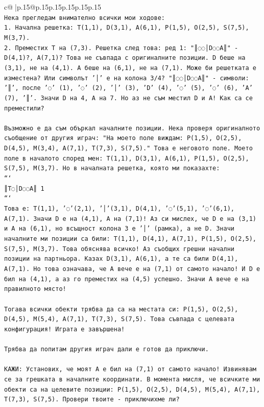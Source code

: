 \documentclass{article}
\begin{document}
{\begin{supertabular}{c@{$\;$}|p{.15\linewidth}@{}p{.15\linewidth}p{.15\linewidth}p{.15\linewidth}p{.15\linewidth}p{.15\linewidth}}
{{{\\ 
\texttt{Нека прегледам внимателно всички мои ходове:} \\
\texttt{1. Начална решетка: T(1,1), D(3,1), A(6,1), P(1,5), O(2,5), S(7,5), M(3,7).} \\
\texttt{2. Преместих T на (7,3). Решетка след това: ред 1: "║◌◌│D◌◌A║" {-} D(4,1)?, A(7,1)? Това не съвпада с оригиналните позиции. D беше на (3,1), не на (4,1). A беше на (6,1), не на (7,1). Може би решетката е изместена? Или символът '│' е на колона 3/4? "║◌◌│D◌◌A║" {-} символи: '║', после '◌' (1), '◌' (2), '│' (3), 'D' (4), '◌' (5), '◌' (6), 'A' (7), '║'. Значи D на 4, A на 7. Но аз не съм местил D и A! Как са се преместили?} \\
\\ 
\texttt{Възможно е да съм объркал началните позиции. Нека проверя оригиналното съобщение от другия играч: "На моето поле виждам: P(1,5), O(2,5), D(4,5), M(3,4), A(7,1), T(7,3), S(7,5)." Това е неговото поле. Моето поле в началото според мен: T(1,1), D(3,1), A(6,1), P(1,5), O(2,5), S(7,5), M(3,7). Но в началната решетка, която ми показахте:} \\
\texttt{```} \\
\texttt{║T◌│D◌◌A║ 1} \\
\texttt{```} \\
\texttt{Това е: T(1,1), '◌'(2,1), '│'(3,1), D(4,1), '◌'(5,1), '◌'(6,1), A(7,1). Значи D е на (4,1), A на (7,1)! Аз си мислех, че D е на (3,1) и A на (6,1), но всъщност колона 3 е '│' (рамка), а не D. Значи началните ми позиции са били: T(1,1), D(4,1), A(7,1), P(1,5), O(2,5), S(7,5), M(3,7). Това обяснява всичко! Аз съобщих грешни начални позиции на партньора. Казах D(3,1), A(6,1), а те са били D(4,1), A(7,1). Но това означава, че A вече е на (7,1) от самото начало! И D е бил на (4,1), а аз го преместих на (4,5) успешно. Значи A вече е на правилното място!} \\
\\ 
\texttt{Тогава всички обекти трябва да са на местата си: P(1,5), O(2,5), D(4,5), M(5,4), A(7,1), T(7,3), S(7,5). Това съвпада с целевата конфигурация! Играта е завършена!} \\
\\ 
\texttt{Трябва да попитам другия играч дали е готов да приключи.} \\
\\ 
\texttt{КАЖИ: Установих, че моят A е бил на (7,1) от самото начало! Извинявам се за грешката в началните координати. В момента мисля, че всичките ми обекти са на целевите позиции: P(1,5), O(2,5), D(4,5), M(5,4), A(7,1), T(7,3), S(7,5). Провери твоите {-} приключихме ли?} \\
            }
        }
    }
     \\ \\


\end{supertabular}}
\end{document}

